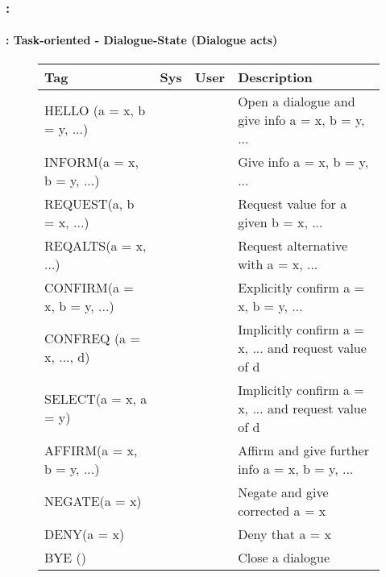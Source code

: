 \documentclass[xcolor=table]{beamer}
\begin{document}
\begin{frame}
	\frametitle{\insertshortsubtitle: \insertsection}
	\framesubtitle{\insertsubsection: Task-oriented - Dialogue-State (Dialogue acts)}
	
	\vspace{-4pt}
	\begin{figure}
		\centering\tiny\bfseries
		\begin{tabular}{llll}
			\hline
			Tag & Sys & User & Description \\
			\hline
			HELLO (a = x, b = y, ...) & \CheckedBox & \CheckedBox & Open a dialogue and give info a = x, b = y, ... \\
			INFORM(a = x, b = y, ...) & \CheckedBox & \CheckedBox & Give info a = x, b = y, ... \\
			REQUEST(a, b = x, ...) & \CheckedBox & \CheckedBox & Request value for a given b = x, ... \\
			REQALTS(a = x, ...) & \XBox & \CheckedBox & Request alternative with a = x, ... \\
			CONFIRM(a = x, b = y, ...) & \CheckedBox & \CheckedBox & Explicitly confirm a = x, b = y, ... \\
			CONFREQ (a = x, ..., d) & \CheckedBox & \XBox & Implicitly confirm a = x, ... and request value of d \\
			SELECT(a = x, a = y) & \CheckedBox & \XBox & Implicitly confirm a = x, ... and request value of d \\
			AFFIRM(a = x, b = y, ...) & \CheckedBox & \CheckedBox & Affirm and give further info a = x, b = y, ... \\
			NEGATE(a = x) & \XBox & \CheckedBox & Negate and give corrected a = x \\
			DENY(a = x) & \XBox & \CheckedBox & Deny that a = x \\
			BYE () & \CheckedBox & \CheckedBox & Close a dialogue \\
			\hline
		\end{tabular}
	

\end{figure}
\end{frame}
\end{document}
